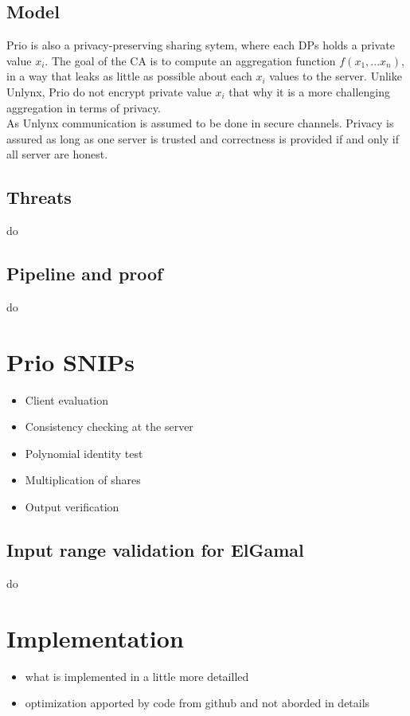 \documentclass{article}
\begin{document}
\subsection{Model}
Prio is also a privacy-preserving sharing sytem, where each DPs holds a private value $x_i$. The goal of the CA is to compute an aggregation function $f(x_1,...x_n)$, in a way that leaks as little as possible about each $x_i$ values to the server. Unlike Unlynx, Prio do not encrypt private value $x_i$ that why it is a more challenging aggregation in terms of privacy.\\
As Unlynx communication is assumed to be done in secure channels. Privacy is assured as long as one server is trusted and correctness is provided if and only if all server are honest.

\subsection{Threats}
do

\subsection{Pipeline and proof}
do 
\section*{Prio SNIPs}
\begin{itemize}
\item Client evaluation
\item Consistency checking at the server
\item Polynomial identity test
\item Multiplication of shares
\item Output verification

\end{itemize}

\subsection{Input range validation for ElGamal}
do

\section*{Implementation}
\begin{itemize}

\item what is implemented in a little more detailled
\item optimization apported by code from github and not aborded in details

\end{itemize}
\end{document}
